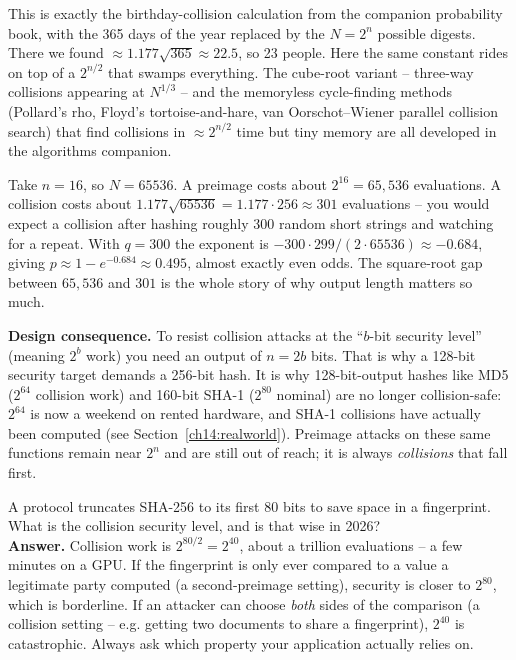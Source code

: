 \begin{connectionbox}
This is exactly the birthday-collision calculation from the companion probability book, with the 365 days of the year replaced by the $N = 2^{n}$ possible digests. There we found $\approx 1.177\sqrt{365} \approx 22.5$, so 23 people. Here the same constant rides on top of a $2^{n/2}$ that swamps everything. The cube-root variant -- three-way collisions appearing at $N^{1/3}$ -- and the memoryless cycle-finding methods (Pollard's rho, Floyd's tortoise-and-hare, van Oorschot--Wiener parallel collision search) that find collisions in $\approx 2^{n/2}$ time but tiny memory are all developed in the algorithms companion.
\end{connectionbox}

\begin{example}
\label{ch14:ex-16bit}
Take $n = 16$, so $N = 65536$. A preimage costs about $2^{16} = 65{,}536$ evaluations. A collision costs about $1.177\sqrt{65536} = 1.177 \cdot 256 \approx 301$ evaluations -- you would expect a collision after hashing roughly 300 random short strings and watching for a repeat. With $q = 300$ the exponent is $-300\cdot 299/(2\cdot 65536) \approx -0.684$, giving $p \approx 1 - e^{-0.684} \approx 0.495$, almost exactly even odds. The square-root gap between $65{,}536$ and $301$ is the whole story of why output length matters so much.
\end{example}

\begin{focusbox}
\textbf{Design consequence.} To resist collision attacks at the ``$b$-bit security level'' (meaning $2^{b}$ work) you need an output of $n = 2b$ bits. That is why a 128-bit security target demands a 256-bit hash. It is why 128-bit-output hashes like MD5 ($2^{64}$ collision work) and 160-bit SHA-1 ($2^{80}$ nominal) are no longer collision-safe: $2^{64}$ is now a weekend on rented hardware, and SHA-1 collisions have actually been computed (see Section~\ref{ch14:realworld}). Preimage attacks on these same functions remain near $2^{n}$ and are still out of reach; it is always \emph{collisions} that fall first.
\end{focusbox}

\begin{walkbox}
A protocol truncates SHA-256 to its first 80 bits to save space in a fingerprint. What is the collision security level, and is that wise in 2026? \\[0.3em]
\textbf{Answer.} Collision work is $2^{80/2} = 2^{40}$, about a trillion evaluations -- a few minutes on a GPU. If the fingerprint is only ever compared to a value a legitimate party computed (a second-preimage setting), security is closer to $2^{80}$, which is borderline. If an attacker can choose \emph{both} sides of the comparison (a collision setting -- e.g. getting two documents to share a fingerprint), $2^{40}$ is catastrophic. Always ask which property your application actually relies on.
\end{walkbox}

